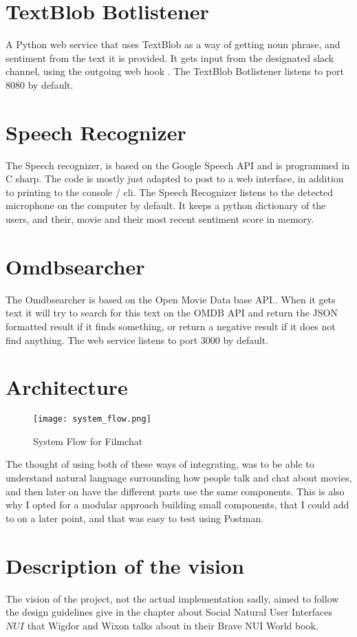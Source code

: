 \documentclass[11pt,fleqn]{book} %
\begin{document}
\section{TextBlob Botlistener}
A Python web service that uses TextBlob\cite{TextBlobTutorial:Documentation} as a way of getting noun phrase, and sentiment from the text it is provided. It gets input from the designated slack channel, using the outgoing web hook \cite{SlackOutgoingSlack}. The TextBlob Botlistener listens to port 8080 by default.

\section{Speech Recognizer}
The Speech recognizer, is based on the Google Speech API \cite{GoogleCloudPlatformSpeechPlatform} and is programmed in C sharp. The code is mostly just adapted to post to a web interface, in addition to printing to the console / cli. The Speech Recognizer listens to the detected microphone on the computer by default. It keeps a python dictionary of the users, and their, movie and their most recent sentiment score in memory.

\section{Omdbsearcher}
The Omdbsearcher is based on the Open Movie Data base API.\cite{OMDbDatabase}. When it gets text it will try to search for this text on the OMDB API and return the JSON formatted result if it finds something, or return a negative result if it does not find anything. The web service listens to port 3000 by default.

\newpage
\section{Architecture}
\begin{figure}[]
  \centering
   \texttt{[image: system\_flow.png]}
  \caption{System Flow for Filmchat}
  \label{fig:system_flow}
\end{figure}
The thought of using both of these ways of integrating, was to be able to understand natural language surrounding how people talk and chat about movies, and then later on have the different parts use the same components. This is also why I opted for a modular approach building small components, that I could add to on a later point, and that was easy to test using Postman.

\section{Description of the vision}
The vision of the project, not the actual implementation sadly, aimed to follow the design guidelines give in the chapter about Social Natural User Interfaces \(NUI\) that Wigdor and Wixon talks about in their Brave NUI World book. \cite{WigdorBraveWorld}
\end{document}
